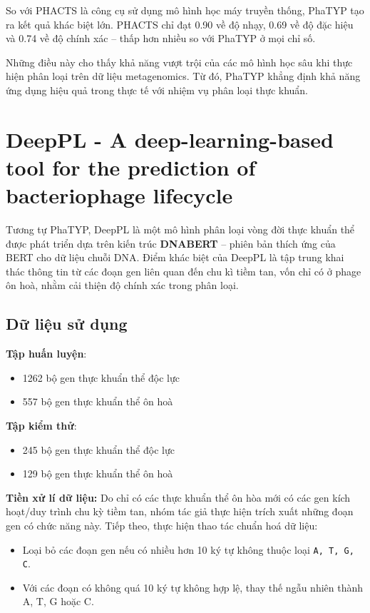 So với PHACTS là công cụ sử dụng mô hình học máy truyền thống, PhaTYP tạo ra kết quả khác biệt lớn. PHACTS chỉ đạt 0.90 về độ nhạy, 0.69 về độ đặc hiệu và 0.74 về độ chính xác – thấp hơn nhiều so với PhaTYP ở mọi chỉ số. 

Những điều này cho thấy khả năng vượt trội của các mô hình học sâu khi thực hiện phân loại trên dữ liệu metagenomics. Từ đó, PhaTYP khẳng định khả năng ứng dụng hiệu quả trong thực tế với nhiệm vụ phân loại thực khuẩn.

\section{DeepPL - A deep-learning-based tool for the prediction of bacteriophage lifecycle \cite{DeepPL_10.1371/journal.pcbi.1012525}}
Tương tự PhaTYP, DeepPL là một mô hình phân loại vòng đời thực khuẩn thể được phát triển dựa trên kiến trúc \textbf{DNABERT} – phiên bản thích ứng của BERT cho dữ liệu chuỗi DNA. Điểm khác biệt của DeepPL là tập trung khai thác thông tin từ các đoạn gen liên quan đến chu kì tiềm tan, vốn chỉ có ở phage ôn hoà, nhằm cải thiện độ chính xác trong phân loại.

\subsection*{Dữ liệu sử dụng}

\textbf{Tập huấn luyện}:
\begin{itemize}
    \item 1262 bộ gen thực khuẩn thể độc lực
    \item 557 bộ gen thực khuẩn thể ôn hoà
\end{itemize}
    
\textbf{Tập kiểm thử}:
\begin{itemize}
    \item 245 bộ gen thực khuẩn thể độc lực
    \item 129 bộ gen thực khuẩn thể ôn hoà
\end{itemize}
    
\textbf{Tiền xử lí dữ liệu:}
Do chỉ có các thực khuẩn thể ôn hòa mới có các gen kích hoạt/duy trình chu kỳ tiềm tan, nhóm tác giả thực hiện trích xuất những đoạn gen có chức năng này. Tiếp theo, thực hiện thao tác chuẩn hoá dữ liệu:
\begin{itemize}
    \item Loại bỏ các đoạn gen nếu có nhiều hơn 10 ký tự không thuộc loại \texttt{A, T, G, C}.
    \item Với các đoạn có không quá 10 ký tự không hợp lệ, thay thế ngẫu nhiên thành A, T, G hoặc C.
\end{itemize}


